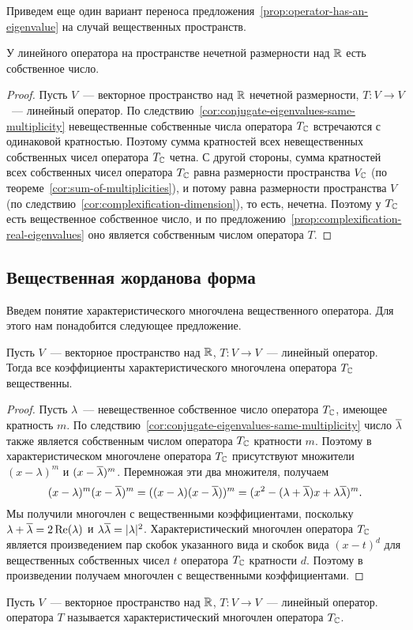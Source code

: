 Приведем еще один вариант переноса
предложения~\ref{prop:operator-has-an-eigenvalue} на случай
вещественных пространств.
\begin{proposition}
У линейного оператора на пространстве нечетной размерности над $\mathbb R$
есть собственное число.
\end{proposition}
\begin{proof}
Пусть $V$~--- векторное пространство над $\mathbb R$ нечетной размерности,
$T\colon V\to V$~--- линейный оператор.
По следствию~\ref{cor:conjugate-eigenvalues-same-multiplicity}
невещественные собственные числа оператора $T_\mathbb C$ встречаются с одинаковой
кратностью. Поэтому сумма кратностей всех невещественных собственных чисел
оператора $T_\mathbb C$ четна. С другой стороны, сумма кратностей
всех собственных чисел оператора $T_\mathbb C$ равна размерности
пространства $V_\mathbb C$ (по теореме~\ref{cor:sum-of-multiplicities}), и потому
равна размерности пространства $V$
(по следствию~\ref{cor:complexification-dimension}), то есть, нечетна.
Поэтому у $T_\mathbb C$ есть вещественное собственное число,
и по предложению~\ref{prop:complexification-real-eigenvalues}
оно является собственным числом оператора $T$.
\end{proof}

\subsection{Вещественная жорданова форма}

Введем понятие характеристического многочлена вещественного оператора.
Для этого нам понадобится следующее предложение.
\begin{proposition}\label{prop:complexification-char-poly-is-real}
Пусть $V$~--- векторное пространство над $\mathbb R$, $T\colon V\to V$~--- линейный
оператор. Тогда все коэффициенты характеристического многочлена
оператора $T_\mathbb C$ вещественны.
\end{proposition}
\begin{proof}
Пусть $\lambda$~--- невещественное собственное число оператора $T_\mathbb C$,
имеющее кратность $m$. По
следствию~\ref{cor:conjugate-eigenvalues-same-multiplicity} число
$\overline\lambda$ также является собственным числом оператора $T_\mathbb C$
кратности $m$. Поэтому в характеристическом многочлене оператора
$T_\mathbb C$ присутствуют множители $(x-\lambda)^m$ и
$(x-\overline\lambda)^m$. Перемножая эти два множителя,
получаем
$$
(x-\lambda)^m(x-\overline\lambda)^m = ((x-\lambda)(x-\overline\lambda))^m
=(x^2-(\lambda+\overline\lambda)x+\lambda\overline\lambda)^m.
$$
Мы получили многочлен с вещественными коэффициентами,
поскольку $\lambda+\overline\lambda = 2\operatorname{Re}(\lambda)$ и
$\lambda\overline\lambda=|\lambda|^2$.
Характеристический многочлен оператора $T_\mathbb C$ является произведением
пар скобок указанного вида и скобок вида $(x-t)^d$ для вещественных
собственных чисел $t$ оператора $T_\mathbb C$ кратности $d$.
Поэтому в произведении получаем многочлен с вещественными коэффициентами.
\end{proof}
\begin{definition}
Пусть $V$~--- векторное пространство над $\mathbb R$, $T\colon V\to V$~--- линейный
оператор.  оператора $T$
называется характеристический многочлен оператора $T_\mathbb C$.
\end{definition}

